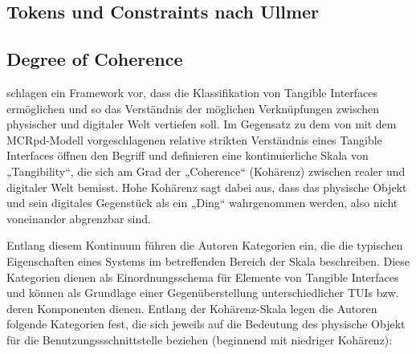 \subsection{Tokens und Constraints nach Ullmer}
\citep{Ullmer02}
\citep{Ullmer05}


\subsection{Degree of Coherence} %
\label{sub:degree_of_coherence}
\citet{Koleva03} schlagen ein Framework vor, dass die Klassifikation von Tangible Interfaces ermöglichen und so das Verständnis der möglichen Verknüpfungen zwischen physischer und digitaler Welt vertiefen soll. Im Gegensatz zu dem von \citet{Ullmer00} mit dem MCRpd-Modell vorgeschlagenen relative strikten Verständnis eines Tangible Interfaces öffnen \citeauthor{Koleva03} den Begriff und definieren eine kontinuierliche Skala von „Tangibility“, die sich am Grad der „Coherence“ (Kohärenz) zwischen realer und digitaler Welt bemisst. Hohe Kohärenz sagt dabei aus, dass das physische Objekt und sein digitales Gegenstück als ein „Ding“ wahrgenommen werden, also nicht voneinander abgrenzbar sind.

Entlang diesem Kontinuum führen die Autoren Kategorien ein, die die typischen Eigenschaften eines Systems im betreffenden Bereich der Skala beschreiben. Diese Kategorien dienen als Einordnungsschema für Elemente von Tangible Interfaces und können als Grundlage einer Gegenüberstellung unterschiedlicher \glspl{TUI} bzw. deren Komponenten dienen. Entlang der Kohärenz-Skala legen die Autoren folgende Kategorien fest, die sich jeweils auf die Bedeutung des physische Objekt für die Benutzungssschnittstelle beziehen (beginnend mit niedriger Kohärenz): 

